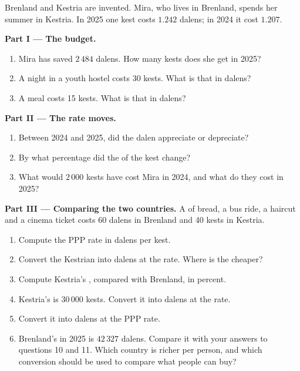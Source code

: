 \begin{problem}
\label{pb:g9:exchange-rates-and-purchasing-power:1}
Brenland and Kestria are invented. Mira, who lives in Brenland, spends her summer in Kestria. In 2025 one
kest costs $1.242$ dalens; in 2024 it cost $1.207$.

\medskip
\noindent\textbf{Part I --- The budget.}
\begin{enumerate}
  \item Mira has saved $2\,484$ dalens. How many kests does she get in 2025?
  \item A night in a youth hostel costs 30 kests. What is that in dalens?
  \item A meal costs 15 kests. What is that in dalens?
\end{enumerate}

\medskip
\noindent\textbf{Part II --- The rate moves.}
\begin{enumerate}[resume]
  \item Between 2024 and 2025, did the dalen appreciate or depreciate?
  \item By what percentage did the  of the kest change?
  \item What would $2\,000$ kests have cost Mira in 2024, and what do they cost in 2025?
\end{enumerate}

\medskip
\noindent\textbf{Part III --- Comparing the two countries.} A  of bread, a bus ride, a haircut and a
cinema ticket costs 60 dalens in Brenland and 40 kests in Kestria.
\begin{enumerate}[resume]
  \item Compute the PPP rate in dalens per kest.
  \item Convert the Kestrian  into dalens at the  rate. Where is the  cheaper?
  \item Compute Kestria's , compared with Brenland, in percent.
  \item Kestria's  is $30\,000$ kests. Convert it into dalens at the  rate.
  \item Convert it into dalens at the PPP rate.
  \item Brenland's  in 2025 is $42\,327$ dalens. Compare it with your answers to questions 10
        and 11. Which country is richer per person, and which conversion should be used to compare what
        people can buy?
\end{enumerate}
\end{problem}
